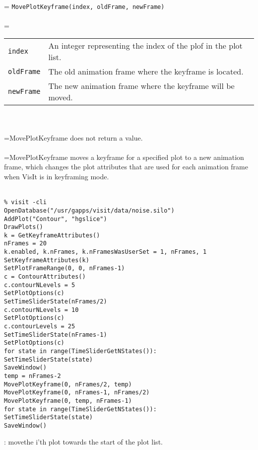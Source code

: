 \documentclass[10pt,a4paper]{report}
\begin{document}
 \\ 
\hangindent=\parindent 
\verb!MovePlotKeyframe(index, oldFrame, newFrame)!\\ [-3mm]

 \\ 
\hangindent=\parindent 
\begin{tabular}{lp{9cm}}
\verb!index! & An integer representing the index of the plof in the plot list. \\
\verb!oldFrame! & The old animation frame where the keyframe is located. \\
\verb!newFrame! & The new animation frame where the keyframe will be moved. \\
\end{tabular} \\[-2mm]


 \\ 
\hangindent=\parindent MovePlotKeyframe does not return a value. \\[-3mm] 

 \\ 
\hangindent=\parindent MovePlotKeyframe moves a keyframe for a specified plot to a new animation frame, which changes the plot attributes that are used for each animation frame when VisIt is in keyframing mode. \\[-3mm] 

\\[-6mm]
\begin{verbatim}% visit -cli
OpenDatabase("/usr/gapps/visit/data/noise.silo")
AddPlot("Contour", "hgslice")
DrawPlots()
k = GetKeyframeAttributes()
nFrames = 20
k.enabled, k.nFrames, k.nFramesWasUserSet = 1, nFrames, 1
SetKeyframeAttributes(k)
SetPlotFrameRange(0, 0, nFrames-1)
c = ContourAttributes()
c.contourNLevels = 5
SetPlotOptions(c)
SetTimeSliderState(nFrames/2)
c.contourNLevels = 10
SetPlotOptions(c)
c.contourLevels = 25
SetTimeSliderState(nFrames-1)
SetPlotOptions(c)
for state in range(TimeSliderGetNStates()):
SetTimeSliderState(state)
SaveWindow()
temp = nFrames-2
MovePlotKeyframe(0, nFrames/2, temp)
MovePlotKeyframe(0, nFrames-1, nFrames/2)
MovePlotKeyframe(0, temp, nFrames-1)
for state in range(TimeSliderGetNStates()):
SetTimeSliderState(state)
SaveWindow()
\end{verbatim}
\newpage


{}
: movethe i'th plot towards the start of the plot list.\\[-3mm]
\end{document}
